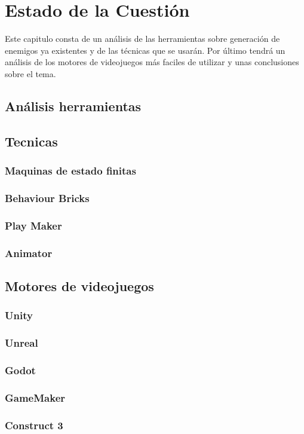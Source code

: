 \chapter{Estado de la Cuestión}
\label{cap:estadoDeLaCuestion}
Este capitulo consta de un análisis de las herramientas sobre generación de enemigos ya existentes  y de las técnicas que se usarán. Por último tendrá un análisis de los motores de videojuegos más faciles de utilizar  y unas conclusiones sobre el tema. 
\section{Análisis herramientas}
\section{Tecnicas}
\subsection{Maquinas de estado finitas}
\subsection{Behaviour Bricks}
\subsection{Play Maker}
\subsection{Animator}
\section{Motores de videojuegos}
\subsection{Unity}
\subsection{Unreal}
\subsection{Godot}
\subsection{GameMaker}
\subsection{Construct 3}
